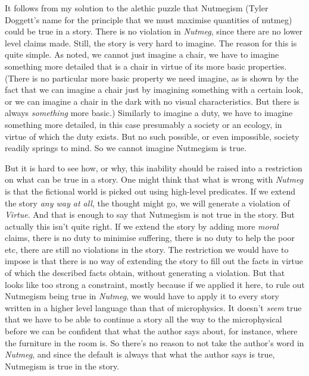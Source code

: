 \documentclass[
  10pt,
  letterpaper,
  DIV=11,
  numbers=noendperiod,
  twoside]{scrartcl}
\begin{document}
It follows from my solution to the alethic puzzle that Nutmegism (Tyler
Doggett's name for the principle that we must maximise quantities of
nutmeg) could be true in a story. There is no violation in
\emph{Nutmeg}, since there are no lower level claims made. Still, the
story is very hard to imagine. The reason for this is quite simple. As
noted, we cannot just imagine a chair, we have to imagine something more
detailed that is a chair in virtue of its more basic properties. (There
is no particular more basic property we need imagine, as is shown by the
fact that we can imagine a chair just by imagining something with a
certain look, or we can imagine a chair in the dark with no visual
characteristics. But there is always \emph{something} more basic.)
Similarly to imagine a duty, we have to imagine something more detailed,
in this case presumably a society or an ecology, in virtue of which the
duty exists. But no such possible, or even impossible, society readily
springs to mind. So we cannot imagine Nutmegism is true.

But it is hard to see how, or why, this inability should be raised into
a restriction on what can be true in a story. One might think that what
is wrong with \emph{Nutmeg} is that the fictional world is picked out
using high-level predicates. If we extend the story \emph{any way at
all}, the thought might go, we will generate a violation of
\emph{Virtue}. And that is enough to say that Nutmegism is not true in
the story. But actually this isn't quite right. If we extend the story
by adding more \emph{moral} claims, there is no duty to minimise
suffering, there is no duty to help the poor etc, there are still no
violations in the story. The restriction we would have to impose is that
there is no way of extending the story to fill out the facts in virtue
of which the described facts obtain, without generating a violation. But
that looks like too strong a constraint, mostly because if we applied it
here, to rule out Nutmegism being true in \emph{Nutmeg}, we would have
to apply it to every story written in a higher level language than that
of microphysics. It doesn't \emph{seem} true that we have to be able to
continue a story all the way to the microphysical before we can be
confident that what the author says about, for instance, where the
furniture in the room is. So there's no reason to not take the author's
word in \emph{Nutmeg}, and since the default is always that what the
author says is true, Nutmegism is true in the story.
\end{document}
